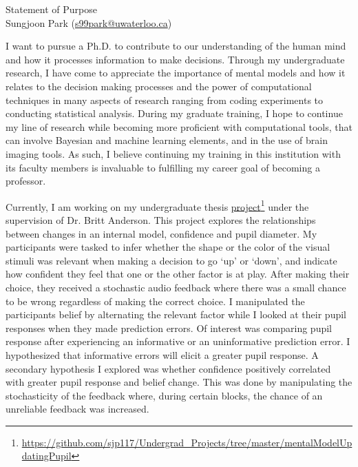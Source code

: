 \documentclass[12pt]{article}
\let\oldcenter\center
\let\oldendcenter\endcenter
\renewenvironment{center}{\setlength\topsep{-1pt}\oldcenter}{\oldendcenter}
\begin{document}
	
	\begin{center}
		\singlespacing
		{\Large Statement of Purpose} \\
		{\normalsize Sungjoon Park (\href{mailto:s99park@uwaterloo.ca}{s99park@uwaterloo.ca})}
	\end{center}
	
	I want to pursue a Ph.D. to contribute to our understanding of the human mind and how it processes information to make decisions. Through my undergraduate research, I have come to appreciate the importance of mental models and how it relates to the decision making processes and the power of computational techniques in many aspects of research ranging from coding experiments to conducting statistical analysis. During my graduate training, I hope to continue my line of research while becoming more proficient with computational tools, that can involve Bayesian and machine learning elements, and in the use of brain imaging tools. As such, I believe continuing my training in this institution with its faculty members is invaluable to fulfilling my career goal of becoming a professor.

	Currently, I am working on my undergraduate thesis \href{https://github.com/sjp117/Undergrad_Projects/tree/master/mentalModelUpdatingPupil}{project}\footnote{\url{https://github.com/sjp117/Undergrad\_Projects/tree/master/mentalModelUpdatingPupil}} under the supervision of Dr. Britt Anderson. This project explores the relationships between changes in an internal model, confidence and pupil diameter. My participants were tasked to infer whether the shape or the color of the visual stimuli was relevant when making a decision to go `up' or `down', and indicate how confident they feel that one or the other factor is at play. After making their choice, they received a stochastic audio feedback where there was a small chance to be wrong regardless of making the correct choice. I manipulated the participants belief by alternating the relevant factor while I looked at their pupil responses when they made prediction errors. Of interest was comparing pupil response after experiencing an informative or an uninformative prediction error. I hypothesized that informative errors will elicit a greater pupil response. A secondary hypothesis I explored was whether confidence positively correlated with greater pupil response and belief change. This was done by manipulating the stochasticity of the feedback where, during certain blocks, the chance of an unreliable feedback was increased.
\end{document}
